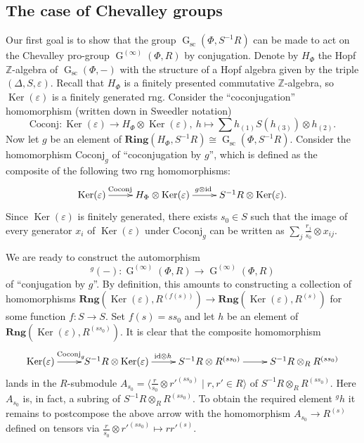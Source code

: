 \documentclass[oneside, 11pt]{amsart}
\numberwithin{equation}{section}
\theoremstyle{definition}
\theoremstyle{remark}
\DeclareMathOperator\Ker{Ker}
\DeclareMathOperator\GG{G}
\newcommand{\Rng}{\mathbf{Rng}}
\newcommand{\ZZ}{\mathbb{Z}}
\newcommand{\up}[2]{{^{#1}\!{#2}}}
\begin{document}
\subsection{The case of Chevalley groups} \label{sec:local-Chevalley}
Our first goal is to show that the group \(\GG_{\mathrm{sc}}(\Phi, S^{-1} R)\) can be made to act on the Chevalley pro-group \(\GG^{(\infty)}(\Phi, R)\) by conjugation. Denote by \(H_\Phi\) the Hopf \(\ZZ\)-algebra of \(\GG_{\mathrm{sc}}(\Phi, -)\) with the structure of a Hopf algebra given by the triple $(\Delta, S, \varepsilon)$. Recall that \(H_\Phi\) is a finitely presented commutative \(\ZZ\)-algebra, so $\Ker(\varepsilon)$ is a finitely generated rng. Consider the ``coconjugation'' homomorphism (written down in Sweedler notation)
\[\mathrm{Coconj} \colon \Ker(\varepsilon) \to H_\Phi \otimes \Ker(\varepsilon),\ h \mapsto \sum h_{(1)} S(h_{(3)}) \otimes h_{(2)}.\]
Now let $g$ be an element of $\mathbf{Ring}(H_\Phi, S^{-1}R) \cong \GG_{\mathrm{sc}}(\Phi, S^{-1} R)$.
Consider the homomorphism $\mathrm{Coconj}_g$ of ``coconjugation by $g$'', which is defined as the composite of the following two rng homomorphisms:
\[\xymatrix{\Ker(\varepsilon) \ar[r]^(.4){\mathrm{Coconj}} & H_\Phi \otimes \Ker(\varepsilon) \ar[r]^(0.45){g\otimes\mathrm{id}} & S^{-1}R \otimes \Ker(\varepsilon).}\]
Since $\Ker(\varepsilon)$ is finitely generated, there exists $s_0 \in S$ such that the image of every generator $x_i$ of $\Ker(\varepsilon)$ under $\mathrm{Coconj}_g$ can be written as $\sum_j \frac{r_j}{s_0} \otimes x_{ij}$.

We are ready to construct the automorphism \[\up g{(-)} \colon \GG^{(\infty)}(\Phi, R) \to \GG^{(\infty)}(\Phi, R)\] of ``conjugation by $g$''. By definition, this amounts to constructing a collection of homomorphisms
$\Rng(\Ker(\varepsilon), R^{(f(s))}) \to \Rng(\Ker(\varepsilon), R^{(s)})$ for some function $f \colon S \to S$. Set $f(s) = ss_0$ and let $h$ be an element of $\Rng(\Ker(\varepsilon), R^{(ss_0)})$. It is clear that the composite homomorphism
\[\xymatrix{ \Ker(\varepsilon) \ar[r]^(0.4){\mathrm{Coconj}_g} & S^{-1}R \otimes \Ker(\varepsilon) \ar[r]^{\mathrm{id}\otimes h} & S^{-1}R \otimes R^{(ss_0)} \ar[r] & S^{-1}R \otimes_R R^{(ss_0)}}\]
lands in the $R$-submodule $A_{s_0} = \langle \frac{r}{s_0} \otimes r'^{(ss_0)}\mid r, r' \in R \rangle$ of $S^{-1}R \otimes_R R^{(ss_0)}$. Here $A_{s_0}$ is, in fact, a subring of $S^{-1}R \otimes_R R^{(ss_0)}$. To obtain the required element $\up g h$ it remains to postcompose the above arrow with the homomorphism $A_{s_0} \to R^{(s)}$ defined on tensors via $\frac{r}{s_0} \otimes r'^{(ss_0)} \mapsto rr'^{(s)}$.
\end{document}
